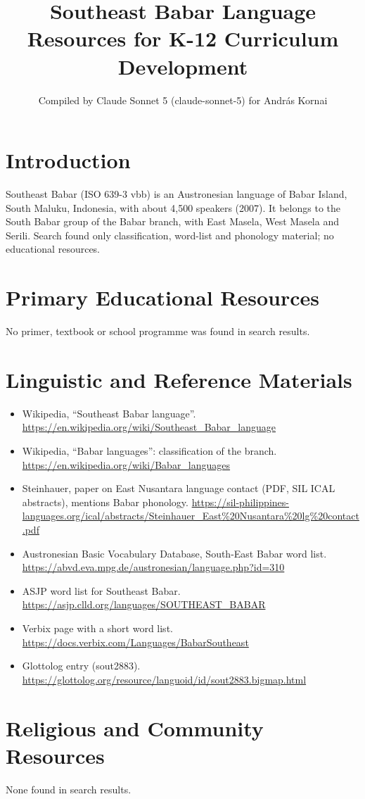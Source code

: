 \documentclass[12pt]{article}
\title{Southeast Babar Language Resources for K-12 Curriculum Development}
\author{Compiled by Claude Sonnet 5 (claude-sonnet-5) for Andr\'as Kornai}
\date{}
\begin{document}
\maketitle

\section{Introduction}
Southeast Babar (ISO 639-3 vbb) is an Austronesian language of Babar Island, South Maluku, Indonesia, with about 4,500 speakers (2007). It belongs to the South Babar group of the Babar branch, with East Masela, West Masela and Serili. Search found only classification, word-list and phonology material; no educational resources.

\section{Primary Educational Resources}
No primer, textbook or school programme was found in search results.

\section{Linguistic and Reference Materials}
\begin{itemize}
\item Wikipedia, ``Southeast Babar language''. \url{https://en.wikipedia.org/wiki/Southeast_Babar_language}
\item Wikipedia, ``Babar languages'': classification of the branch. \url{https://en.wikipedia.org/wiki/Babar_languages}
\item Steinhauer, paper on East Nusantara language contact (PDF, SIL ICAL abstracts), mentions Babar phonology. \url{https://sil-philippines-languages.org/ical/abstracts/Steinhauer_East%20Nusantara%20lg%20contact.pdf}
\item Austronesian Basic Vocabulary Database, South-East Babar word list. \url{https://abvd.eva.mpg.de/austronesian/language.php?id=310}
\item ASJP word list for Southeast Babar. \url{https://asjp.clld.org/languages/SOUTHEAST_BABAR}
\item Verbix page with a short word list. \url{https://docs.verbix.com/Languages/BabarSoutheast}
\item Glottolog entry (sout2883). \url{https://glottolog.org/resource/languoid/id/sout2883.bigmap.html}
\end{itemize}

\section{Religious and Community Resources}
None found in search results.
\end{document}
